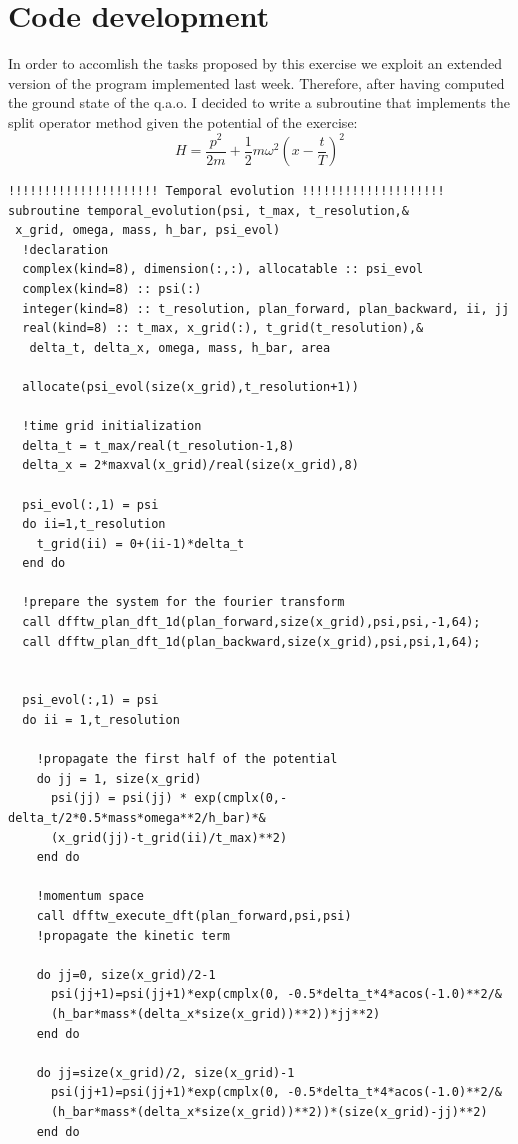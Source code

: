 \documentclass[prb,9pt,notitlepage]{revtex4-1}
\begin{document}
\section{Code development}
In order to accomlish the tasks proposed by this exercise we exploit an extended version of the program implemented last week. Therefore, after having computed the ground state of the q.a.o. I decided to write a subroutine that implements the split operator method given the potential of the exercise:
\begin{equation}
	H=\frac{p^2}{2m}+\frac{1}{2} m \omega^2 \left(x-\frac{t}{T}\right)^2
\end{equation}

\begin{lstlisting}
!!!!!!!!!!!!!!!!!!!!! Temporal evolution !!!!!!!!!!!!!!!!!!!!
subroutine temporal_evolution(psi, t_max, t_resolution,&
 x_grid, omega, mass, h_bar, psi_evol)
  !declaration
  complex(kind=8), dimension(:,:), allocatable :: psi_evol
  complex(kind=8) :: psi(:)
  integer(kind=8) :: t_resolution, plan_forward, plan_backward, ii, jj
  real(kind=8) :: t_max, x_grid(:), t_grid(t_resolution),&
   delta_t, delta_x, omega, mass, h_bar, area

  allocate(psi_evol(size(x_grid),t_resolution+1))

  !time grid initialization
  delta_t = t_max/real(t_resolution-1,8)
  delta_x = 2*maxval(x_grid)/real(size(x_grid),8)

  psi_evol(:,1) = psi
  do ii=1,t_resolution
    t_grid(ii) = 0+(ii-1)*delta_t
  end do

  !prepare the system for the fourier transform
  call dfftw_plan_dft_1d(plan_forward,size(x_grid),psi,psi,-1,64);
  call dfftw_plan_dft_1d(plan_backward,size(x_grid),psi,psi,1,64);


  psi_evol(:,1) = psi
  do ii = 1,t_resolution

    !propagate the first half of the potential
    do jj = 1, size(x_grid)
      psi(jj) = psi(jj) * exp(cmplx(0,-delta_t/2*0.5*mass*omega**2/h_bar)*&
      (x_grid(jj)-t_grid(ii)/t_max)**2)
    end do

    !momentum space
    call dfftw_execute_dft(plan_forward,psi,psi)
    !propagate the kinetic term

    do jj=0, size(x_grid)/2-1
      psi(jj+1)=psi(jj+1)*exp(cmplx(0, -0.5*delta_t*4*acos(-1.0)**2/&
      (h_bar*mass*(delta_x*size(x_grid))**2))*jj**2)
    end do

    do jj=size(x_grid)/2, size(x_grid)-1
      psi(jj+1)=psi(jj+1)*exp(cmplx(0, -0.5*delta_t*4*acos(-1.0)**2/&
      (h_bar*mass*(delta_x*size(x_grid))**2))*(size(x_grid)-jj)**2)
    end do


\end{lstlisting}
\end{document}
